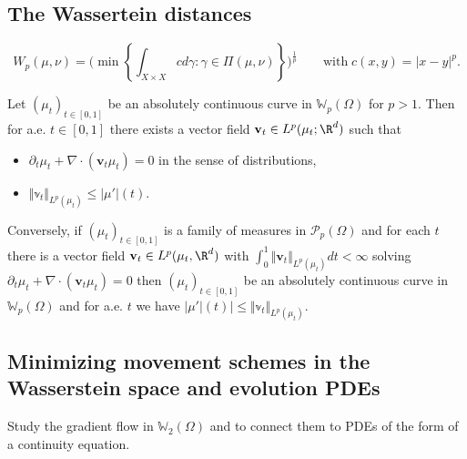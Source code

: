 \subsection{The Wassertein distances}
\begin{equation*}
    W_p(\mu, \nu) = \Big(\min \left\lbrace  \int_{X\times X} cd\gamma: \gamma\in \Pi(\mu, \nu)\right\rbrace\Big)^{\frac{1}{p}} \qquad\text{with}\;c(x,y) = |x-y|^p.
\end{equation*}
\begin{thm} Let $(\mu_t)_{t\in[0,1]}$ be an absolutely continuous curve in $\mathbb{W}_p(\Omega)$ for $p>1$. Then for a.e. $t\in [0,1]$ there exists a vector field $\mathbf{v}_t\in L^p(\mu_t;\R^d)$ such that
\begin{itemize}
    \item $\partial_t \mu_t + \nabla \cdot (\mathbf{v}_t\mu_t) = 0$ in the sense of distributions,
    \item $\Vert \mathbb{v}_t\Vert_{L^p(\mu_t)} \leq |\mu'|(t)$.
\end{itemize}
Conversely, if $(\mu_t)_{t\in[0,1]}$ is a family of measures in $\mathcal{P}_p(\Omega)$ and for each $t$ there is a vector field $\mathbf{v}_t\in L^p(\mu_t,\R^d)$ with $\int_0^1 \Vert \mathbf{v}_t\Vert_{L^p(\mu_t)}dt < \infty$ solving $\partial_t \mu_t + \nabla \cdot (\mathbf{v}_t\mu_t) = 0$ then $(\mu_t)_{t\in[0,1]}$ be an absolutely continuous curve in $\mathbb{W}_p(\Omega)$ and for a.e. $t$ we have $|\mu'|(t)| \leq \Vert \mathbb{v}_t\Vert_{L^p(\mu_t)} $.
\end{thm}

\subsection{Minimizing movement schemes in the Wasserstein space and evolution PDEs}

Study the gradient flow in $\mathbb{W}_2(\Omega)$ and to connect them to PDEs of the form of a continuity equation.

